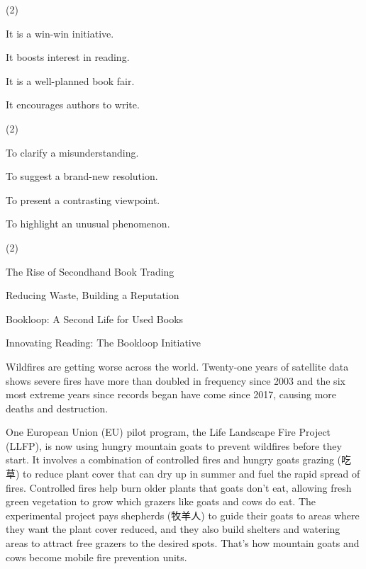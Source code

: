 \documentclass{英语试卷}
\begin{document}
\begin{choices}(2)
  \item It is a win-win initiative.
  \item It boosts interest in reading.
  \item It is a well-planned book fair.
  \item It encourages authors to write.
\end{choices}
\begin{choices}(2)
  \item To clarify a misunderstanding.
  \item To suggest a brand-new resolution.
  \item To present a contrasting viewpoint.
  \item To highlight an unusual phenomenon.
\end{choices}
\begin{choices}(2)
  \item The Rise of Secondhand Book Trading
  \item Reducing Waste, Building a Reputation
  \item Bookloop: A Second Life for Used Books
  \item Innovating Reading: The Bookloop Initiative
\end{choices}
\par Wildfires are getting worse across the world. Twenty-one years of satellite data shows severe fires have more than doubled in frequency since 2003 and the six most extreme years since records began have come since 2017, causing more deaths and destruction.\par
\par One European Union (EU) pilot program, the Life Landscape Fire Project (LLFP), is now using hungry mountain goats to prevent wildfires before they start. It involves a combination of controlled fires and hungry goats grazing (吃草) to reduce plant cover that can dry up in summer and fuel the rapid spread of fires. Controlled fires help burn older plants that goats don't eat, allowing fresh green vegetation to grow which grazers like goats and cows do eat. The experimental project pays shepherds (牧羊人) to guide their goats to areas where they want the plant cover reduced, and they also build shelters and watering areas to attract free grazers to the desired spots. That's how mountain goats and cows become mobile fire prevention units.\par
\end{document}
